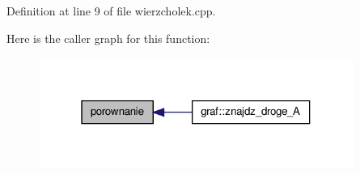 \-Definition at line 9 of file wierzcholek.\-cpp.



\-Here is the caller graph for this function\-:
\nopagebreak
\begin{figure}[H]
\begin{center}
\leavevmode
\includegraphics[width=292pt]{wierzcholek_8hh_abf7cee761b1201166cbe397d8723789a_icgraph}
\end{center}
\end{figure}


